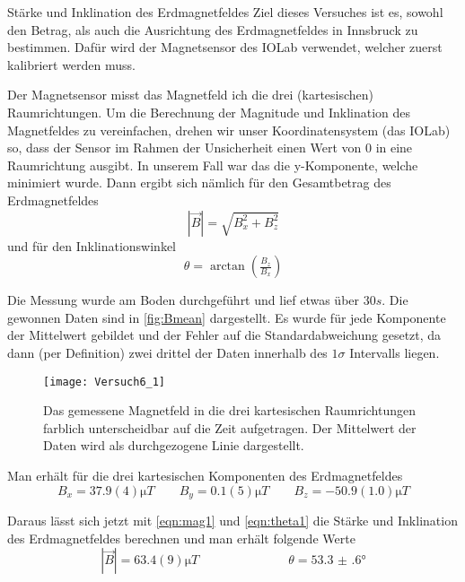 \documentclass{alex_gp}
\begin{document}
\renewcommand{\labelenumi}{\alph{enumi})}


\begin{mybox}{Stärke und Inklination des Erdmagnetfeldes}
	Ziel dieses Versuches ist es, sowohl den Betrag, als auch die Ausrichtung des Erdmagnetfeldes in Innsbruck zu bestimmen. Dafür wird der Magnetsensor des IOLab verwendet, welcher zuerst kalibriert werden muss. 
	
	Der Magnetsensor misst das Magnetfeld ich die drei (kartesischen) Raumrichtungen. Um die Berechnung der Magnitude und Inklination des Magnetfeldes zu vereinfachen, drehen wir unser Koordinatensystem (das IOLab) so, dass der Sensor im Rahmen der Unsicherheit einen Wert von 0 in eine Raumrichtung ausgibt. In unserem Fall war das die y-Komponente, welche minimiert wurde. Dann ergibt sich nämlich für den Gesamtbetrag des Erdmagnetfeldes 
	\begin{equation}\label{eqn:mag1}
		|\vec{B}| = \sqrt{B_x^2 + B_z^2}
	\end{equation}
	und für den Inklinationswinkel
	\begin{equation}\label{eqn:theta1}
		\theta = \arctan(\tfrac{B_z}{B_x})
	\end{equation}
	
	Die Messung wurde am Boden durchgeführt und lief etwas über \( 30 \unit{s} \). Die gewonnen Daten sind in \autoref{fig:Bmean} dargestellt. Es wurde für jede Komponente der Mittelwert gebildet und der Fehler auf die Standardabweichung gesetzt, da dann (per Definition) zwei drittel der Daten innerhalb des \( 1\sigma \) Intervalls liegen. 
	
	\begin{figure}[H]	
		\centering
		\texttt{[image: Versuch6\_1]}
		\caption{Das gemessene Magnetfeld in die drei kartesischen Raumrichtungen farblich unterscheidbar auf die Zeit aufgetragen. Der Mittelwert der Daten wird als durchgezogene Linie dargestellt.}
		\label{fig:Bmean}
	\end{figure}
	
	Man erhält für die drei kartesischen Komponenten des Erdmagnetfeldes
	\begin{equation}\label{eqn:Bxyz}
		B_x = 37.9(4) \unit{\micro T} \qquad B_y = 0.1(5) \unit{\micro T} \qquad B_z = -50.9(1.0) \unit{\micro T}
	\end{equation}

	Daraus lässt sich jetzt mit \autoref{eqn:mag1} und \autoref{eqn:theta1} die Stärke und Inklination des Erdmagnetfeldes berechnen und man erhält folgende Werte
	\begin{equation}\label{eqn:results}
		|\vec{B}| = 63.4(9) \unit{\micro T} \hspace{3cm} \theta = \ang{53.3(6)}
	\end{equation}
	

\end{mybox}
\end{document}
